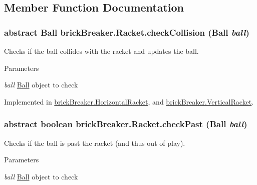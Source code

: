 \subsection{Member Function Documentation}
\hypertarget{classbrick_breaker_1_1_racket_a81880bdbdfda6ec88d1d4e7fc72f8f74}{
\subsubsection[{checkCollision}]{\setlength{\rightskip}{0pt plus 5cm}abstract {\bf Ball} brickBreaker.Racket.checkCollision ({\bf Ball} {\em ball})}}
\label{classbrick_breaker_1_1_racket_a81880bdbdfda6ec88d1d4e7fc72f8f74}
Checks if the ball collides with the racket and updates the ball. 
\begin{DoxyParams}{Parameters}
\item[{\em ball}]\hyperlink{classbrick_breaker_1_1_ball}{Ball} object to check \end{DoxyParams}


Implemented in \hyperlink{classbrick_breaker_1_1_horizontal_racket_a0a504cfa7af83740b19435e73ecd7975}{brickBreaker.HorizontalRacket}, and \hyperlink{classbrick_breaker_1_1_vertical_racket_a8893265e40d1d8946702d26f8c07887b}{brickBreaker.VerticalRacket}.

\hypertarget{classbrick_breaker_1_1_racket_a129dbc802cd26299ebca916283edbe27}{
\subsubsection[{checkPast}]{\setlength{\rightskip}{0pt plus 5cm}abstract boolean brickBreaker.Racket.checkPast ({\bf Ball} {\em ball})}}
\label{classbrick_breaker_1_1_racket_a129dbc802cd26299ebca916283edbe27}
Checks if the ball is past the racket (and thus out of play). 
\begin{DoxyParams}{Parameters}
\item[{\em ball}]\hyperlink{classbrick_breaker_1_1_ball}{Ball} object to check \end{DoxyParams}


